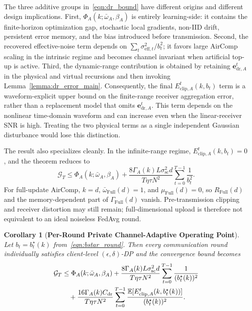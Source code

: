 \documentclass[journal]{IEEEtran}
\newenvironment{revisionblock}{\begingroup\color{revisionred}}{\endgroup}
\newtheorem{corollary}{Corollary}
\begin{document}
\begin{revisionblock}
The three additive groups in~\eqref{eqn:dr_bound} have different origins and different design implications. First, $\Phi_A(k;\bar{\omega}_A,\beta_A)$ is entirely learning-side: it contains the finite-horizon optimization gap, stochastic local gradients, non-IID drift, persistent error memory, and the bias introduced before transmission. Second, the recovered effective-noise term depends on $\sum_t\sigma_{\mathrm{eff},t}^2/b_t^2$; it favors large AirComp scaling in the intrinsic regime and becomes channel invariant when artificial top-up is active. Third, the dynamic-range contribution is obtained by retaining $\mathbf{e}_{\mathrm{dr},A}^t$ in the physical and virtual recursions and then invoking Lemma~\ref{lemma:dr_error_main}. Consequently, the final $E_{\mathrm{clip},A}^t(k,b_t)$ term is a waveform-explicit upper bound on the finite-range receiver aggregation error, rather than a replacement model that omits $\mathbf{e}_{\mathrm{dr},A}^t$. This term depends on the nonlinear time-domain waveform and can increase even when the linear-receiver SNR is high. Treating the two physical terms as a single independent Gaussian disturbance would lose this distinction.

The result also specializes cleanly. In the infinite-range regime, $E_{\mathrm{clip},A}^t(k,b_t)=0$, and the theorem reduces to
{
\begin{equation}
	\mathcal{G}_T
	\le\Phi_A(k;\bar{\omega}_A,\beta_A)
	+\frac{8\Gamma_A(k)L\sigma_{\mathrm{sc}}^2d}{T\eta\tau N^2}
	\sum_{t=0}^{T-1}\frac1{b_t^2}.
	\label{eqn:th1}
\end{equation}
}
For full-update AirComp, $k=d$, $\bar{\omega}_{\mathrm{Full}}(d)=1$, and $\mu_{\mathrm{Full}}(d)=0$, so $R_{\mathrm{Full}}(d)$ and the memory-dependent part of $\Gamma_{\mathrm{Full}}(d)$ vanish. Pre-transmission clipping and receiver distortion may still remain; full-dimensional upload is therefore not equivalent to an ideal noiseless FedAvg round.

\begin{corollary}[\bf Per-Round Private Channel-Adaptive Operating Point]
\label{cor:dynamic_bound}
Let $b_t=b_t^\star(k)$ from~\eqref{eqn:bstar_round}. Then every communication round individually satisfies client-level $(\epsilon,\delta)$-DP and the convergence bound becomes
\begin{align}
 \mathcal G_T
 &\le \Phi_A(k;\bar\omega_A,\beta_A)
 +\frac{8\Gamma_A(k)L\sigma_{\mathrm{sc}}^2d}{T\eta\tau N^2}
 \sum_{t=0}^{T-1}\frac1{(b_t^\star(k))^2}\notag\\
 &\quad+\frac{16\Gamma_A(k)C_{\mathrm{dr}}}{T\eta\tau N^2}
 \sum_{t=0}^{T-1}\frac{\mathbb E[E_{\mathrm{clip},A}^t(k,b_t^\star(k))]}{(b_t^\star(k))^2}.
\end{align}
\end{corollary}


\end{revisionblock}
\end{document}
